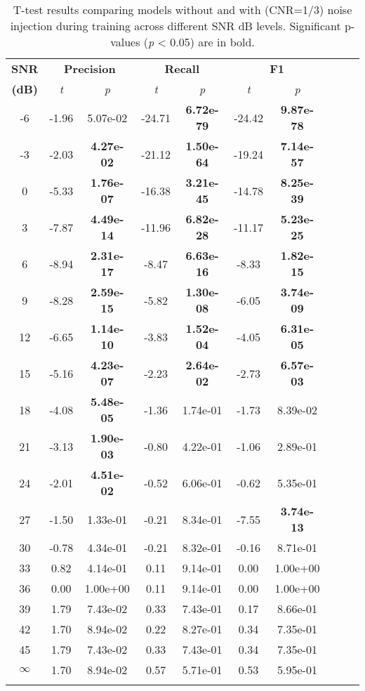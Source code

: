 \documentclass{article}
\begin{document}
\begin{table}[h!]
\centering
\caption{T-test results comparing models without and with (CNR=1/3) noise injection during training across different SNR dB levels. Significant p-values (\textit{p} < 0.05) are in bold.}
\scriptsize
\begin{tabular}{@{}c ccc ccc ccc@{}} %
\toprule
\textbf{SNR} & \multicolumn{2}{c}{\textbf{Precision}} & \multicolumn{2}{c}{\textbf{Recall}} & \multicolumn{2}{c}{\textbf{F1}} \\ 
\textbf{(dB)} & \textit{t} & \textit{p} & \textit{t} & \textit{p} & \textit{t} & \textit{p} \\
\midrule
-6  & -1.96  & 5.07e-02  & -24.71  & \textbf{6.72e-79}  & -24.42  & \textbf{9.87e-78} \\
-3  & -2.03  & \textbf{4.27e-02}  & -21.12  & \textbf{1.50e-64}  & -19.24  & \textbf{7.14e-57} \\
0   & -5.33  & \textbf{1.76e-07}  & -16.38  & \textbf{3.21e-45}  & -14.78  & \textbf{8.25e-39} \\
3   & -7.87  & \textbf{4.49e-14}  & -11.96  & \textbf{6.82e-28}  & -11.17  & \textbf{5.23e-25} \\
6   & -8.94  & \textbf{2.31e-17}  & -8.47   & \textbf{6.63e-16}  & -8.33   & \textbf{1.82e-15} \\
9   & -8.28  & \textbf{2.59e-15}  & -5.82   & \textbf{1.30e-08}  & -6.05   & \textbf{3.74e-09} \\
12  & -6.65  & \textbf{1.14e-10}  & -3.83   & \textbf{1.52e-04}  & -4.05   & \textbf{6.31e-05} \\
15  & -5.16  & \textbf{4.23e-07}  & -2.23   & \textbf{2.64e-02}  & -2.73   & \textbf{6.57e-03} \\
18  & -4.08  & \textbf{5.48e-05}  & -1.36   & 1.74e-01  & -1.73   & 8.39e-02 \\
21  & -3.13  & \textbf{1.90e-03}  & -0.80   & 4.22e-01  & -1.06   & 2.89e-01 \\
24  & -2.01  & \textbf{4.51e-02}  & -0.52   & 6.06e-01  & -0.62   & 5.35e-01 \\
27  & -1.50  & 1.33e-01  & -0.21   & 8.34e-01  & -7.55   & \textbf{3.74e-13} \\
30  & -0.78  & 4.34e-01  & -0.21   & 8.32e-01  & -0.16   & 8.71e-01 \\
33  & 0.82   & 4.14e-01  & 0.11    & 9.14e-01  & 0.00    & 1.00e+00 \\
36  & 0.00   & 1.00e+00  & 0.11    & 9.14e-01  & 0.00    & 1.00e+00 \\
39  & 1.79   & 7.43e-02  & 0.33    & 7.43e-01  & 0.17    & 8.66e-01 \\
42  & 1.70   & 8.94e-02  & 0.22    & 8.27e-01  & 0.34    & 7.35e-01 \\
45  & 1.79   & 7.43e-02  & 0.33    & 7.43e-01  & 0.34    & 7.35e-01 \\
$\infty$ & 1.70   & 8.94e-02  & 0.57    & 5.71e-01  & 0.53    & 5.95e-01 \\
\bottomrule
\label{tab:1}
\end{tabular}
\end{table}
\end{document}
